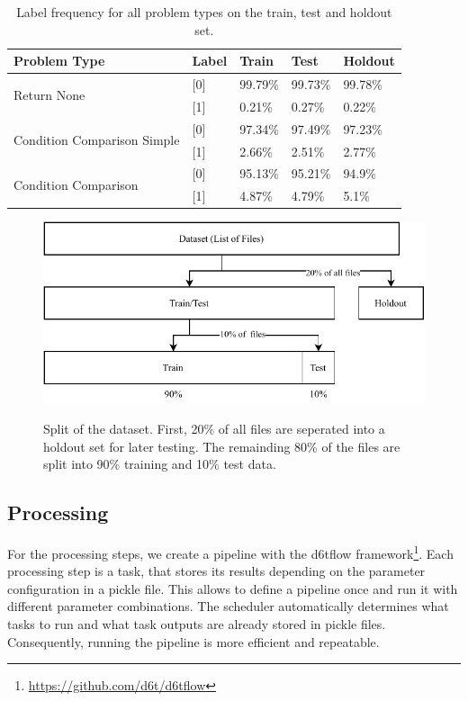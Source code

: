 \begin{table}[]
    \begin{tabularx}{\textwidth}{@{}lXXXX@{}}
    \toprule
    Problem Type                                 & Label& Train & Test & Holdout \\ \midrule 
    \multirow{2}{*}{Return None}                 & [0] & 99.79\%  & 99.73\% & 99.78\%  \\
                                                 & [1] & 0.21\%   & 0.27\%  & 0.22\%    \\ \midrule
    \multirow{2}{*}{Condition Comparison Simple} & [0] & 97.34\%   &  97.49\%  & 97.23\%  \\
                                                 & [1] & 2.66\%   & 2.51\% & 2.77\%    \\ \midrule
    \multirow{2}{*}{Condition Comparison}        & [0] & 95.13\%  & 95.21\%  & 94.9\%  \\
                                                 & [1] & 4.87\%   & 4.79\%  & 5.1\%    \\ \bottomrule
    \end{tabularx}
    \caption{Label frequency for all problem types on the train, test and holdout set.}
    \label{tab:class_distribution}
\end{table}


\begin{figure}
    \includegraphics[width=1\textwidth]{img/ML/Data_split.pdf}
    \label{fig:data_split}
    \caption{Split of the dataset. First, 20\% of all files are seperated into a holdout set for later testing. The remainding 80\% of the files are split into 90\% training and 10\% test data. }
\end{figure}

\subsection{Processing}
For the processing steps, we create a pipeline with the d6tflow framework\footnote{\url{https://github.com/d6t/d6tflow}}. Each processing step is a task, that stores its results depending on the parameter configuration in a pickle file. This allows to define a pipeline once and run it with different parameter combinations. The scheduler automatically determines what tasks to run and what task outputs are already stored in pickle files. Consequently, running the pipeline is more efficient and repeatable.

